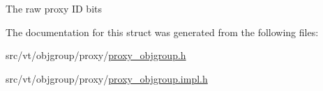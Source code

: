 The raw proxy ID bits 

The documentation for this struct was generated from the following files\+:\begin{DoxyCompactItemize}
\item 
src/vt/objgroup/proxy/\hyperlink{proxy__objgroup_8h}{proxy\+\_\+objgroup.\+h}\item 
src/vt/objgroup/proxy/\hyperlink{proxy__objgroup_8impl_8h}{proxy\+\_\+objgroup.\+impl.\+h}\end{DoxyCompactItemize}
